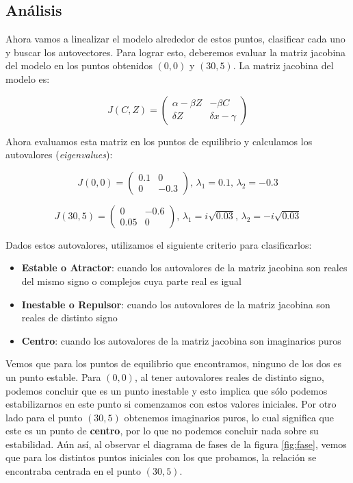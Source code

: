 \documentclass [a4paper,12pt,oneside,final]{article}
\begin{document}
\subsection{Análisis}

Ahora vamos a linealizar el modelo alrededor de estos puntos, clasificar cada uno y buscar los autovectores. Para lograr esto, deberemos evaluar la matriz jacobina del modelo en los puntos obtenidos $(0, 0)$ y $(30, 5)$. La matriz jacobina del modelo es:

\begin{equation*}
J(C, Z) = 
\begin{pmatrix}
\alpha - \beta Z & - \beta C \\
\delta Z & \delta x - \gamma
\end{pmatrix}
\end{equation*}

Ahora evaluamos esta matriz en los puntos de equilibrio y calculamos los autovalores ({\it eigenvalues}):

\begin{equation*}
J(0, 0) = 
\begin{pmatrix}
0.1 & 0 \\
0 & -0.3
\end{pmatrix}
, \,
\lambda_1 = 0.1
, \,
\lambda_2 = -0.3
\end{equation*}

\begin{equation*}
J(30, 5) = 
\begin{pmatrix}
0 & -0.6 \\
0.05 & 0
\end{pmatrix}
, \,
\lambda_1 = i\sqrt{0.03}
, \,
\lambda_2 = -i\sqrt{0.03}
\end{equation*}

Dados estos autovalores, utilizamos el siguiente criterio para clasificarlos:

\begin{itemize}
    \item{{\bf Estable o Atractor}: cuando los autovalores de la matriz jacobina son reales del mismo signo o complejos cuya parte real es igual}
    \item{{\bf Inestable o Repulsor}: cuando los autovalores de la matriz jacobina son reales de distinto signo}
    \item{{\bf Centro}: cuando los autovalores de la matriz jacobina son imaginarios puros}
\end{itemize}

Vemos que para los puntos de equilibrio que encontramos, ninguno de los dos es un punto estable. Para $(0, 0)$, al tener autovalores reales de distinto signo, podemos concluir que es un punto inestable y esto implica que sólo podemos estabilizarnos en este punto si comenzamos con estos valores iniciales. Por otro lado para el punto $(30, 5)$ obtenemos imaginarios puros, lo cual significa que este es un punto de {\bf centro}, por lo que no podemos concluir nada sobre su estabilidad. Aún así, al observar el diagrama de fases de la figura \ref{fig:fase}, vemos que para los distintos puntos iniciales con los que probamos, la relación se encontraba centrada en el punto $(30, 5)$.
\end{document}
